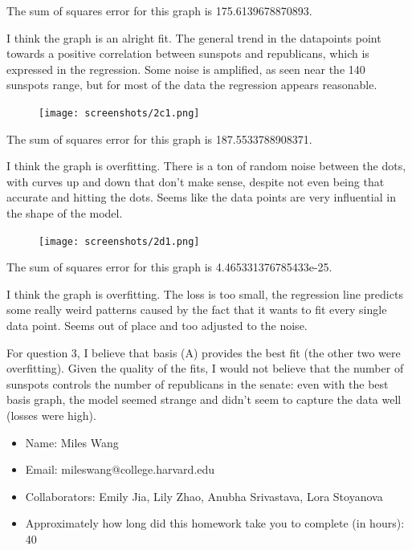 \documentclass[submit]{harvardml}
\begin{document}
\bigskip \noindent The sum of squares error for this graph is 175.6139678870893.

\bigskip \noindent I think the graph is an alright fit. The general trend in the datapoints point towards a positive correlation between sunspots and republicans, which is expressed in the regression. Some noise is amplified, as seen near the 140 sunspots range, but for most of the data the regression appears reasonable. 

\begin{figure}[h]
\centering
\texttt{[image: screenshots/2c1.png]}
\end{figure}

\bigskip \noindent The sum of squares error for this graph is 187.5533788908371.

\bigskip \noindent I think the graph is overfitting. There is a ton of random noise between the dots, with curves up and down that don't make sense, despite not even being that accurate and hitting the dots. Seems like the data points are very influential in the shape of the model. 

\newpage

\begin{figure}[h]
\centering
\texttt{[image: screenshots/2d1.png]}
\end{figure}

\bigskip \noindent The sum of squares error for this graph is 4.465331376785433e-25.

\bigskip \noindent I think the graph is overfitting. The loss is too small, the regression line predicts some really weird patterns caused by the fact that it wants to fit every single data point. Seems out of place and too adjusted to the noise.

\bigskip \noindent For question 3, I believe that basis (A) provides the best fit (the other two were overfitting). Given the quality of the fits, I would not believe that the number of sunspots controls the number of republicans in the senate: even with the best basis graph, the model seemed strange and didn't seem to capture the data well (losses were high).


\newpage
\begin{problem}[Administrative]
\leavevmode
\begin{itemize}
    \item Name: Miles Wang 
    \item Email: mileswang@college.harvard.edu
    \item Collaborators: Emily Jia, Lily Zhao, Anubha Srivastava, Lora Stoyanova
    \item Approximately how long did this homework take you to complete (in hours): 40
\end{itemize}
\end{problem}
\end{document}
